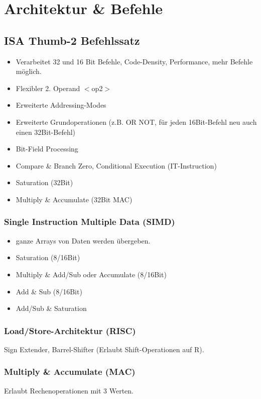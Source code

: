 \section{Architektur \& Befehle}

\subsection{ISA Thumb-2 Befehlssatz}
\begin{itemize}
    \item Verarbeitet 32 und 16 Bit Befehle, Code-Density, Performance, mehr Befehle möglich.
    \item Flexibler 2. Operand $<$op2$>$
    \item Erweiterte Addressing-Modes
    \item Erweiterte Grundoperationen (z.B. OR NOT, für jeden 16Bit-Befehl neu auch einen 32Bit-Befehl)
    \item Bit-Field Processing
    \item Compare \& Branch Zero, Conditional Execution (IT-Instruction)
    \item Saturation (32Bit)
    \item Multiply \& Accumulate (32Bit MAC)
\end{itemize}

\subsubsection{Single Instruction Multiple Data (SIMD)}

\begin{itemize}
    \item ganze Arrays von Daten werden übergeben.
    \item Saturation (8/16Bit)
    \item Multiply \& Add/Sub oder Accumulate (8/16Bit)
    \item Add \& Sub (8/16Bit)
    \item Add/Sub \& Saturation
\end{itemize}

\subsubsection{Load/Store-Architektur (RISC)}
Sign Extender, Barrel-Shifter (Erlaubt Shift-Operationen auf R).

\subsubsection{Multiply \& Accumulate (MAC)}
Erlaubt Rechenoperationen mit 3 Werten.

